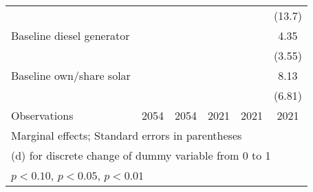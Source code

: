 \begin{table}[htbp]
\begin{tabular*}{1\hsize}{@{\hskip\tabcolsep\extracolsep\fill}l*{5}{c}}
                &                  &                  &                  &                  &   (13.7)         \\
Baseline diesel generator&                  &                  &                  &                  &     4.35         \\
                &                  &                  &                  &                  &   (3.55)         \\
Baseline own/share solar&                  &                  &                  &                  &     8.13         \\
                &                  &                  &                  &                  &   (6.81)         \\
\midrule
Observations    &     2054         &     2054         &     2021         &     2021         &     2021         \\
\bottomrule
\multicolumn{6}{l}{\footnotesize Marginal effects; Standard errors in parentheses}\\
\multicolumn{6}{l}{\footnotesize  (d) for discrete change of dummy variable from 0 to 1}\\
\multicolumn{6}{l}{\footnotesize \sym{*} \(p<0.10\), \sym{**} \(p<0.05\), \sym{***} \(p<0.01\)}\\
\end{tabular*}
\end{table}
